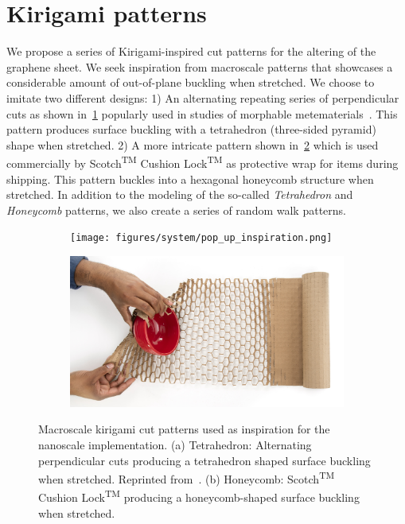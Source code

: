 \section{Kirigami patterns}
We propose a series of Kirigami-inspired cut patterns for the altering of the graphene sheet. We seek inspiration from macroscale patterns that showcases a considerable amount of out-of-plane buckling when stretched. We choose to imitate two different designs: 1) An alternating repeating series of perpendicular cuts as shown in~\cref{fig:kirigami_inspiration_a} popularly used in studies of morphable metematerials~\cite{new_pop_up}. This pattern produces surface buckling with a tetrahedron (three-sided pyramid) shape when stretched. 2) A more intricate pattern shown in~\cref{fig:kirigami_inspiration_b} which is used commercially by Scotch\textsuperscript{TM} Cushion Lock\textsuperscript{TM} \cite{cushion_wrap} as protective wrap for items during shipping. This pattern buckles into a hexagonal honeycomb structure when stretched. In addition to the modeling of the so-called \textit{Tetrahedron} and \textit{Honeycomb} patterns, we also create a series of random walk patterns.

\begin{figure}[!htb]
  \centering
  \begin{subfigure}[t]{0.48\textwidth}
      \centering
      \texttt{[image: figures/system/pop\_up\_inspiration.png]}
      \caption{}
      \label{fig:kirigami_inspiration_a}
    \end{subfigure}
    \hfill
    \begin{subfigure}[t]{0.48\textwidth}
      \centering
      \includegraphics[width=\textwidth]{figures/system/honeycomb_inspiration.jpg}
      \caption{}
      \label{fig:kirigami_inspiration_b}
  \end{subfigure}
  \hfill
     \caption{Macroscale kirigami cut patterns used as inspiration for the nanoscale implementation. (a) Tetrahedron: Alternating perpendicular cuts producing a tetrahedron shaped surface buckling when stretched. Reprinted from~\cite{new_pop_up}. (b) Honeycomb: Scotch\textsuperscript{TM} Cushion Lock\textsuperscript{TM} \cite{cushion_wrap} producing a honeycomb-shaped surface buckling when stretched.}
     \label{fig:kirigami_inspiration}
\end{figure}

